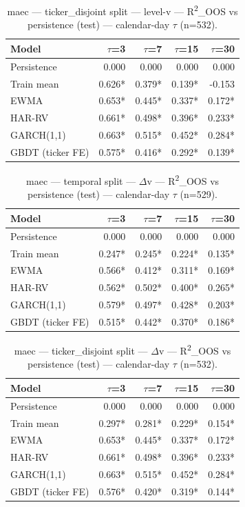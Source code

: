 \begin{table}[t]
\centering
\begin{tabular}{lrrrr}
\toprule
Model & $\tau$=3 & $\tau$=7 & $\tau$=15 & $\tau$=30 \\
\midrule
Persistence & 0.000 & 0.000 & 0.000 & 0.000 \\
Train mean & 0.626* & 0.379* & 0.139* & -0.153 \\
EWMA & 0.653* & 0.445* & 0.337* & 0.172* \\
HAR-RV & 0.661* & 0.498* & 0.396* & 0.233* \\
GARCH(1,1) & 0.663* & 0.515* & 0.452* & 0.284* \\
GBDT (ticker FE) & 0.575* & 0.416* & 0.292* & 0.139* \\
\bottomrule
\end{tabular}
\caption{maec — ticker\_disjoint split — level-v — R\textsuperscript{2}\_OOS vs persistence (test) — calendar-day $\tau$ (n=532).}
\end{table}

\begin{table}[t]
\centering
\begin{tabular}{lrrrr}
\toprule
Model & $\tau$=3 & $\tau$=7 & $\tau$=15 & $\tau$=30 \\
\midrule
Persistence & 0.000 & 0.000 & 0.000 & 0.000 \\
Train mean & 0.247* & 0.245* & 0.224* & 0.135* \\
EWMA & 0.566* & 0.412* & 0.311* & 0.169* \\
HAR-RV & 0.562* & 0.502* & 0.400* & 0.265* \\
GARCH(1,1) & 0.579* & 0.497* & 0.428* & 0.203* \\
GBDT (ticker FE) & 0.515* & 0.442* & 0.370* & 0.186* \\
\bottomrule
\end{tabular}
\caption{maec — temporal split — $\Delta$v — R\textsuperscript{2}\_OOS vs persistence (test) — calendar-day $\tau$ (n=529).}
\end{table}

\begin{table}[t]
\centering
\begin{tabular}{lrrrr}
\toprule
Model & $\tau$=3 & $\tau$=7 & $\tau$=15 & $\tau$=30 \\
\midrule
Persistence & 0.000 & 0.000 & 0.000 & 0.000 \\
Train mean & 0.297* & 0.281* & 0.229* & 0.154* \\
EWMA & 0.653* & 0.445* & 0.337* & 0.172* \\
HAR-RV & 0.661* & 0.498* & 0.396* & 0.233* \\
GARCH(1,1) & 0.663* & 0.515* & 0.452* & 0.284* \\
GBDT (ticker FE) & 0.576* & 0.420* & 0.319* & 0.144* \\
\bottomrule
\end{tabular}
\caption{maec — ticker\_disjoint split — $\Delta$v — R\textsuperscript{2}\_OOS vs persistence (test) — calendar-day $\tau$ (n=532).}
\end{table}

